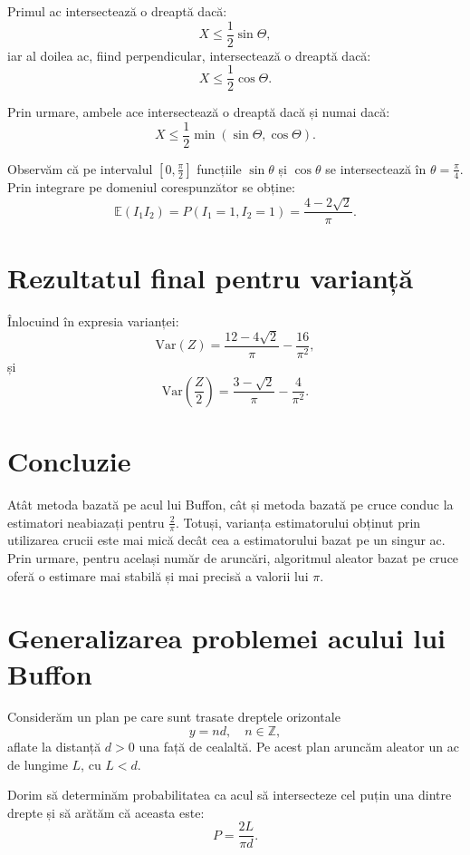 \documentclass[12pt]{article}
\begin{document}
Primul ac intersectează o dreaptă dacă:
\[
X \le \frac{1}{2}\sin\Theta,
\]
iar al doilea ac, fiind perpendicular, intersectează o dreaptă dacă:
\[
X \le \frac{1}{2}\cos\Theta.
\]

Prin urmare, ambele ace intersectează o dreaptă dacă și numai dacă:
\[
X \le \frac{1}{2}\min(\sin\Theta, \cos\Theta).
\]

Observăm că pe intervalul $\left[0,\frac{\pi}{2}\right]$ funcțiile $\sin\theta$ și $\cos\theta$ se intersectează în $\theta = \frac{\pi}{4}$. Prin integrare pe domeniul corespunzător se obține:
\[
\mathbb{E}(I_1 I_2) = P(I_1 = 1, I_2 = 1)
= \frac{4 - 2\sqrt{2}}{\pi}.
\]

\section{Rezultatul final pentru varianță}

Înlocuind în expresia varianței:
\[
\mathrm{Var}(Z) = \frac{12 - 4\sqrt{2}}{\pi} - \frac{16}{\pi^2},
\]
și
\[
\mathrm{Var}\!\left(\frac{Z}{2}\right)
= \frac{3 - \sqrt{2}}{\pi} - \frac{4}{\pi^2}.
\]

\section{Concluzie}

Atât metoda bazată pe acul lui Buffon, cât și metoda bazată pe cruce conduc la estimatori neabiazați pentru $\frac{2}{\pi}$. Totuși, varianța estimatorului obținut prin utilizarea crucii este mai mică decât cea a estimatorului bazat pe un singur ac. Prin urmare, pentru același număr de aruncări, algoritmul aleator bazat pe cruce oferă o estimare mai stabilă și mai precisă a valorii lui $\pi$.

\newpage

\par
\section{Generalizarea problemei acului lui Buffon}

Considerăm un plan pe care sunt trasate dreptele orizontale
\[
y = nd, \quad n \in \mathbb{Z},
\]
aflate la distanță $d>0$ una față de cealaltă. Pe acest plan aruncăm aleator un ac de lungime $L$, cu $L<d$.

Dorim să determinăm probabilitatea ca acul să intersecteze cel puțin una dintre drepte și să arătăm că aceasta este:
\[
P = \frac{2L}{\pi d}.
\]
\end{document}
